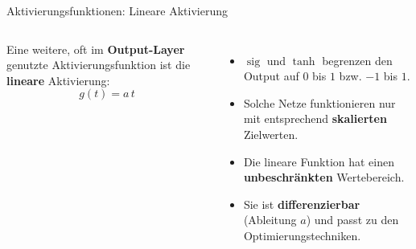 \begin{frame}{Aktivierungsfunktionen: Lineare Aktivierung}
\footnotesize
\begin{columns}
Eine weitere, oft im \textbf{Output-Layer} genutzte Aktivierungsfunktion
ist die \textbf{lineare} Aktivierung:
\[
  g(t) = a\,t
\]

\begin{itemize}
  \item $\operatorname{sig}$ und $\tanh$ begrenzen den Output auf $0$ bis $1$ bzw. $-1$ bis $1$.
  \item Solche Netze funktionieren nur mit entsprechend \textbf{skalierten}
        Zielwerten.
  \item Die lineare Funktion hat einen \textbf{unbeschränkten}
        Wertebereich.
  \item Sie ist \textbf{differenzierbar} (Ableitung $a$) und passt zu den
        Optimierungstechniken.
\end{itemize}

\centering
{}
\end{columns}
\end{frame}

